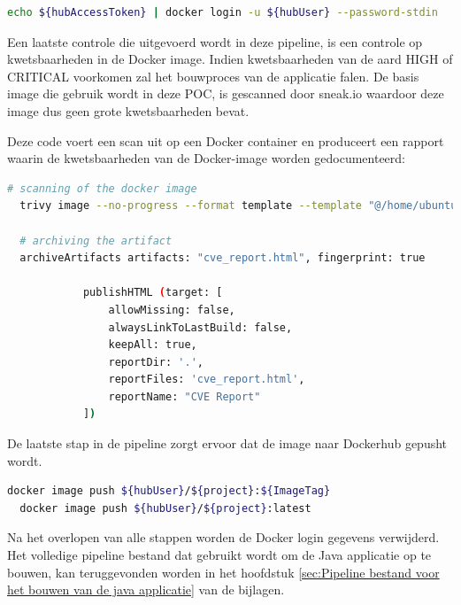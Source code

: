 \begin{lstlisting}[language=bash, style=bashstyle]
  echo ${hubAccessToken} | docker login -u ${hubUser} --password-stdin
\end{lstlisting}

\vspace{0.5cm}
Een laatste controle die uitgevoerd wordt in deze pipeline, is een controle op kwetsbaarheden in de Docker image. Indien kwetsbaarheden van de aard HIGH of CRITICAL voorkomen zal het bouwproces van de applicatie falen. De basis image die gebruik wordt in deze POC, is gescanned door sneak.io waardoor deze image dus geen grote kwetsbaarheden bevat.
\newline

Deze code voert een scan uit op een Docker container en produceert een rapport waarin de kwetsbaarheden van de Docker-image worden gedocumenteerd:
\newline

\begin{lstlisting}[language=bash, style=bashstyle]
  # scanning of the docker image
  trivy image --no-progress --format template --template "@/home/ubuntu/html.tpl" -o cve_report.html --exit-code 1 --severity HIGH,CRITICAL ${hubUser}/${project}:latest
  
  # archiving the artifact
  archiveArtifacts artifacts: "cve_report.html", fingerprint: true

            publishHTML (target: [
                allowMissing: false,
                alwaysLinkToLastBuild: false,
                keepAll: true,
                reportDir: '.',
                reportFiles: 'cve_report.html',
                reportName: "CVE Report"
            ])
\end{lstlisting}

\vspace{0.5cm}
De laatste stap in de pipeline zorgt ervoor dat de image naar Dockerhub gepusht wordt.
\newline

\begin{lstlisting}[language=bash, style=bashstyle]
  docker image push ${hubUser}/${project}:${ImageTag}
  docker image push ${hubUser}/${project}:latest
\end{lstlisting}

\vspace{0.5cm}
Na het overlopen van alle stappen worden de Docker login gegevens verwijderd. Het volledige pipeline bestand dat gebruikt wordt om de Java applicatie op te bouwen, kan teruggevonden worden in het hoofdstuk \ref{sec:Pipeline bestand voor het bouwen van de java applicatie} van de bijlagen.

